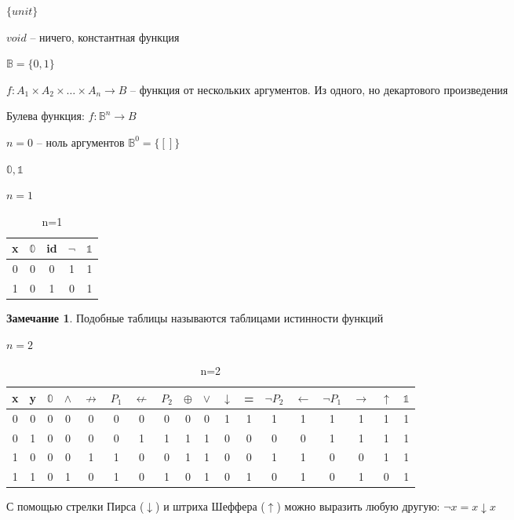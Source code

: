 \documentclass{book}
\theoremstyle{definition}
\newtheorem*{note}{Замечание}
\begin{document}
    $\{unit\}$

    $void$ -- ничего, константная функция

    $\mathbb{B} = \{0,1\}$

    $f:A_1\times A_2\times \ldots\times A_n \to B$  -- функция от нескольких аргументов. Из одного, но декартового произведения

    Булева функция: $f:\mathbb{B}^n\to B$

    $n=0$ -- ноль аргументов $\mathbb{B}^0 = \{[]\}$

    $\mathbb{0}, \mathds{1}$
     
    $n=1\quad$
    \begin{table}[htpb]
        \centering
        \caption{n=1}
        \label{tab:n1}
        \begin{tabular}{c|cccc}
            x&$\mathbb{0}$&id&$\neg$&$\mathds{1}$\\\hline
        0 &0  &0  &1  &1\\
        1&0&1&0&1 \\
        \end{tabular}
    \end{table}
   \begin{note}
       Подобные таблицы называются таблицами истинности функций
   \end{note} 
    $n=2$
    \begin{table}[htpb]
        \centering
        \caption{n=2}
        \label{tab:n2}
        \begin{tabular}{cc|cccccccccccccccc}
            x&y  & $\mathbb{0}$ & $\land$   &$\not\to $  & $P_1$ & $\not\leftarrow$ & $P_2$ &$\oplus$ & $\vee$ & $\downarrow$ & = & $\neg P_2$ & $\leftarrow$ & $\neg P_1$ & $\to $ & $\uparrow$ & $\mathds{1}$ \\\hline
         0&  0&  0& 0 & 0 & 0 & 0 & 0 & 0 & 0 & 1 & 1 & 1 & 1 & 1 &1  &1  &1 \\
         0&  1&  0&  0& 0 & 0 &1  & 1 &  1&  1& 0 & 0 & 0 & 0 &1  & 1 & 1 & 1\\
         1&  0&  0&  0&  1&  1& 0 &0  & 1 & 1 & 0 & 0 & 1 & 1 & 0 & 0 &1  &1 \\
         1&  1&  0&  1&  0&  1& 0 & 1 & 0 & 1 & 0 & 1 & 0 & 1 & 0 & 1 & 0 & 1\\
        \end{tabular}
    \end{table}

    С помощью стрелки Пирса ($\downarrow$) и штриха Шеффера ($\uparrow$) можно выразить любую другую: $\neg x  = x \downarrow x$
\end{document}
